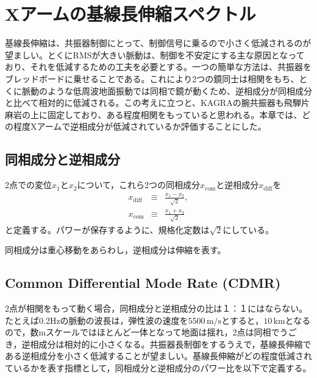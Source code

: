 \section{Xアームの基線長伸縮スペクトル}
基線長伸縮は、共振器制御にとって、制御信号に乗るので小さく低減されるのが望ましい。とくにRMSが大きい脈動は、制御を不安定にする主な原因となっており、それを低減するための工夫を必要とする。一つの簡単な方法は、共振器をブレッドボードに乗せることである。これにより2つの鏡同士は相関をもち、とくに脈動のような低周波地面振動では同相で鏡が動くため、逆相成分が同相成分と比べて相対的に低減される。この考えに立つと、KAGRAの腕共振器も飛騨片麻岩の上に固定しており、ある程度相関をもっていると思われる。本章では、どの程度Xアームで逆相成分が低減されているか評価することにした。


\subsection{同相成分と逆相成分}
2点での変位$x_{1}$と$x_{2}$について，これら2つの同相成分$x_{\mathrm{com}}$と逆相成分$x_\mathrm{diff}$を
\begin{eqnarray}\label{eq:eq22}
  x_{\mathrm{diff}} &\equiv& \frac{x_{1}-x_{2}}{\sqrt{2}}, \\
  x_{\mathrm{com}}  &\equiv& \frac{x_{1}+x_{2}}{\sqrt{2}}
\end{eqnarray}
と定義する。パワーが保存するように、規格化定数は$\sqrt{2}$にしている。


同相成分は重心移動をあらわし，逆相成分は伸縮を表す。

\subsection{Common Differential Mode Rate (CDMR)}
2点が相関をもって動く場合，同相成分と逆相成分の比は１：１にはならない。たとえば0.2Hzの脈動の波長は，弾性波の速度を$5500\, \mathrm{m/s}$とすると，$10\,\mathrm{km} $となるので，数mスケールではほとんど一体となって地面は揺れ，2点は同相でうごき，逆相成分は相対的に小さくなる。共振器長制御をするうえで，基線長伸縮である逆相成分を小さく低減することが望ましい。基線長伸縮がどの程度低減されているかを表す指標として，同相成分と逆相成分のパワー比を以下で定義する。



